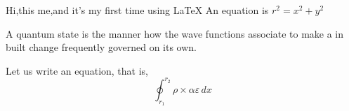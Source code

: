 \documentclass{article}
\begin{document}
Hi,this me,and it's my first time using \LaTeX
An equation is $r^2=x^2+y^2$
 
 A quantum state is the manner how the wave functions associate to make a in built change frequently governed on its own.

Let us write an equation, that is,
\begin{equation}
\oint_{r_1}^{r_2} \rho \times \alpha \varepsilon \, dx 
\end{equation}
\end{document}
